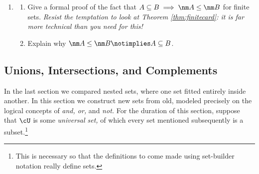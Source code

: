\begin{enumerate}
	\item\begin{enumerate}
	  \item Give a formal proof of the fact that $A\subseteq B\implies \nm A\le\nm B$ for finite sets. \emph{Resist the temptation to look at Theorem \ref{thm:finitecard}: it is far more technical than you need for this!}
	  \item Explain why $\nm A\le \nm B\notimplies A\subseteq B$.
  	\end{enumerate}
\end{enumerate}
\newpage

\subsection{Unions, Intersections, and Complements}

In the last section we compared nested sets, where one set fitted entirely inside another. In this section we construct new sets from old, modeled precisely on the logical concepts of \emph{and, or,} and \emph{not.}
For the duration of this section, suppose that $\cU$ is some \emph{universal set,} of which every set mentioned subsequently is a subset.\footnote{This is necessary so that the definitions to come made using set-builder notation really define sets.}\\


